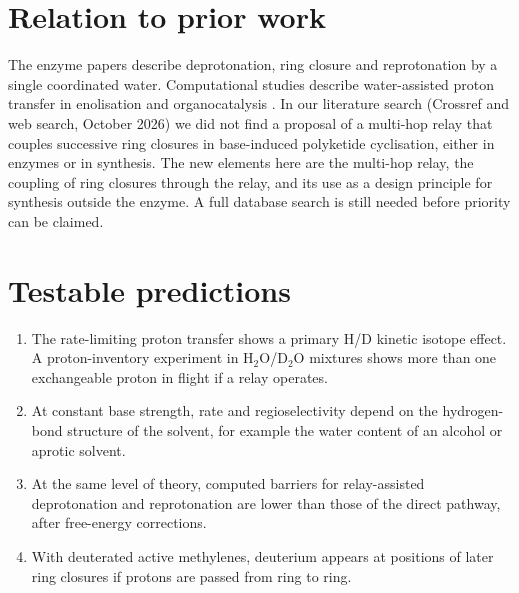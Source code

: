 \documentclass[11pt]{article}
\begin{document}
\section{Relation to prior work}
The enzyme papers \cite{ames2008,lee2012} describe deprotonation, ring closure and reprotonation by a single coordinated water. Computational studies describe water-assisted proton transfer in enolisation and organocatalysis \cite{alagona2010,armstrong2014}. In our literature search (Crossref and web search, October 2026) we did not find a proposal of a multi-hop relay that couples successive ring closures in base-induced polyketide cyclisation, either in enzymes or in synthesis. The new elements here are the multi-hop relay, the coupling of ring closures through the relay, and its use as a design principle for synthesis outside the enzyme. A full database search is still needed before priority can be claimed.

\section{Testable predictions}
\begin{enumerate}
\item[P1] The rate-limiting proton transfer shows a primary H/D kinetic isotope effect. A proton-inventory experiment in H$_2$O/D$_2$O mixtures shows more than one exchangeable proton in flight if a relay operates.
\item[P2] At constant base strength, rate and regioselectivity depend on the hydrogen-bond structure of the solvent, for example the water content of an alcohol or aprotic solvent.
\item[P3] At the same level of theory, computed barriers for relay-assisted deprotonation and reprotonation are lower than those of the direct pathway, after free-energy corrections.
\item[P4] With deuterated active methylenes, deuterium appears at positions of later ring closures if protons are passed from ring to ring.
\end{enumerate}
\end{document}
